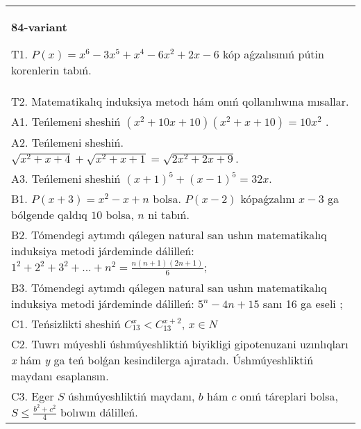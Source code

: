 \documentclass{article}
\begin{document}
\begin{tabular}{m{17cm}}
\textbf{84-variant}
\newline

T1. \(P(x) = x^{6} - 3x^{5} + x^{4} - 6x^{2} + 2x - 6\) kóp aǵzalısınıń pútin korenlerin tabıń. \\
T2. Matematikalıq induksiya metodı hám onıń qollanılıwına mısallar. \\
A1. Teńlemeni sheshiń \(\left( x^{2} + 10x + 10 \right)\left( x^{2} + x + 10 \right) = 10x^{2}\) . \\
A2. Teńlemeni sheshiń. \(\sqrt{x^{2} + x + 4} + \sqrt{x^{2} + x + 1} = \sqrt{2x^{2} + 2x + 9}\). \\
A3. Teńlemeni sheshiń \((x + 1)^{5} + (x - 1)^{5} = 32x\). \\
B1. \(P(x + 3) = x^{2} - x + n\) bolsa. \(P(x - 2)\) kópaǵzalını \(x - 3\) ga bólgende qaldıq \(10\) bolsa, \(n\) ni tabıń. \\
B2. Tómendegi aytımdı qálegen natural san ushın matematikalıq induksiya metodi járdeminde dálilleń: \(1^{2} + 2^{2} + 3^{2} + ... + n^{2} = \frac{n(n + 1)(2n + 1)}{6}\); \\
B3. Tómendegi aytımdı qálegen natural san ushın matematikalıq induksiya metodi járdeminde dálilleń: \(5^{n} - 4n + 15\) sanı 16 ga eseli ; \\
C1. Teńsizlikti sheshiń \(C_{13}^{x} < C_{13}^{x + 2}\), \(x \in N\) \\
C2. Tuwrı múyeshli úshmúyeshliktiń biyikligi gipotenuzani uzınlıqları \emph{x} hám \emph{y} ga teń bolǵan kesindilerga ajıratadı. Úshmúyeshliktiń maydanı esaplansın. \\
C3. Eger \(S\) úshmúyeshliktiń maydanı, \(b\) hám \(c\) onıń táreplari bolsa, \(S \leq \frac{b^{2} + c^{2}}{4}\) bolıwın dálilleń. \\

\end{tabular}
\vspace{1cm}
\end{document}
